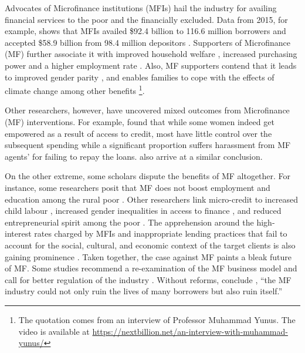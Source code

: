 \documentclass[a4paper, nobind]{templates/ociamthesis}
\begin{document}
\noindent Advocates of Microfinance institutions (MFIs) hail the industry for availing financial services to the poor and the financially excluded. Data from 2015, for example, shows that MFIs availed \$92.4 billion to 116.6 million borrowers and accepted \$58.9 billion from 98.4 million depositors \autocite{market2014global}. Supporters of Microfinance (MF) further associate it with improved household welfare \autocite{meador2017food,you2013role}, increased purchasing power and a higher employment rate \autocite{raihan2017macro,lopatta2016microfinance}. Also, MF supporters contend that it leads to improved gender parity \autocite{mafukata2017reciprocal,zhang2017microfinance}, and enables families to cope with the effects of climate change \autocite{fenton2017role} among other benefits \footnote{The quotation comes from an interview of Professor Muhammad Yunus. The video is available at \url{https://nextbillion.net/an-interview-with-muhammad-yunus/}}.

Other researchers, however, have uncovered mixed outcomes from Microfinance (MF) interventions. For example, \textcite{ganle2015microcredit} found that while some women indeed get empowered as a result of access to credit, most have little control over the subsequent spending while a significant proportion suffers harassment from MF agents' for failing to repay the loans. \textcite{van2012impact} also arrive at a similar conclusion.

On the other extreme, some scholars dispute the benefits of MF altogether. For instance, some researchers posit that MF does not boost employment and education among the rural poor \autocite{bauchet2013micro}. Other researchers link micro-credit to increased child labour \autocite{hazarika2008household}, increased gender inequalities in access to finance \autocite{zulfiqar2017does}, and reduced entrepreneurial spirit among the poor \autocite{field2013does}. The apprehension around the high-interest rates charged by MFIs and inappropriate lending practices that fail to account for the social, cultural, and economic context of the target clients is also gaining prominence \autocite{chester2016one}. Taken together, the case against MF paints a bleak future of MF. Some studies recommend a re-examination of the MF business model and call for better regulation of the industry \autocite{johnson2013microfinance,ghosh2013microfinance}. Without reforms, conclude \textcite{chester2016one}, ``the MF industry could not only ruin the lives of many borrowers but also ruin itself.''
\end{document}
